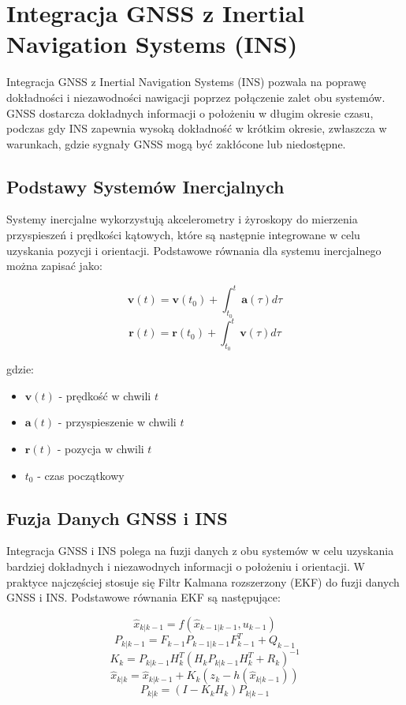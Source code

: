 \section{Integracja GNSS z Inertial Navigation Systems (INS)}
Integracja GNSS z Inertial Navigation Systems (INS) pozwala na poprawę dokładności i niezawodności nawigacji poprzez połączenie zalet obu systemów. GNSS dostarcza dokładnych informacji o położeniu w długim okresie czasu, podczas gdy INS zapewnia wysoką dokładność w krótkim okresie, zwłaszcza w warunkach, gdzie sygnały GNSS mogą być zakłócone lub niedostępne.

\subsection{Podstawy Systemów Inercjalnych}
Systemy inercjalne wykorzystują akcelerometry i żyroskopy do mierzenia przyspieszeń i prędkości kątowych, które są następnie integrowane w celu uzyskania pozycji i orientacji. Podstawowe równania dla systemu inercjalnego można zapisać jako:

\[
\mathbf{v}(t) = \mathbf{v}(t_0) + \int_{t_0}^{t} \mathbf{a}(\tau) d\tau
\]
\[
\mathbf{r}(t) = \mathbf{r}(t_0) + \int_{t_0}^{t} \mathbf{v}(\tau) d\tau
\]

gdzie:
\begin{itemize}
    \item \( \mathbf{v}(t) \) - prędkość w chwili \( t \)
    \item \( \mathbf{a}(t) \) - przyspieszenie w chwili \( t \)
    \item \( \mathbf{r}(t) \) - pozycja w chwili \( t \)
    \item \( t_0 \) - czas początkowy
\end{itemize}

\subsection{Fuzja Danych GNSS i INS}
Integracja GNSS i INS polega na fuzji danych z obu systemów w celu uzyskania bardziej dokładnych i niezawodnych informacji o położeniu i orientacji. W praktyce najczęściej stosuje się Filtr Kalmana rozszerzony (EKF) do fuzji danych GNSS i INS. Podstawowe równania EKF są następujące:

\[
\hat{x}_{k|k-1} = f(\hat{x}_{k-1|k-1}, u_{k-1})
\]
\[
P_{k|k-1} = F_{k-1} P_{k-1|k-1} F_{k-1}^T + Q_{k-1}
\]
\[
K_k = P_{k|k-1} H_k^T (H_k P_{k|k-1} H_k^T + R_k)^{-1}
\]
\[
\hat{x}_{k|k} = \hat{x}_{k|k-1} + K_k (z_k - h(\hat{x}_{k|k-1}))
\]
\[
P_{k|k} = (I - K_k H_k) P_{k|k-1}
\]

